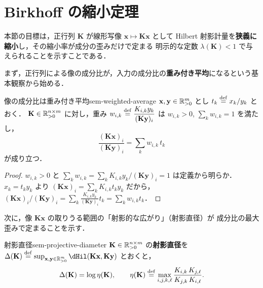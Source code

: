 \section{Birkhoff の縮小定理}
\label{sec:sem-birkhoff}

本節の目標は，正行列 $\mathbf{K}$ が線形写像 $\mathbf{x} \mapsto \mathbf{K}\mathbf{x}$ として
Hilbert 射影計量を\textbf{狭義に縮小}し，その縮小率が成分の歪みだけで定まる
明示的な定数 $\lambda(\mathbf{K}) < 1$ で与えられることを示すことである．

まず，正行列による像の成分比が，入力の成分比の\textbf{重み付き平均}になるという基本観察から始める．

\begin{claim}{像の成分比は重み付き平均}{sem-weighted-average}
  $\mathbf{x}, \mathbf{y} \in \mathbb{R}_{>0}^m$ とし $t_k \overset{\mathrm{def}}{=} x_k / y_k$ とおく．
  $\mathbf{K} \in \mathbb{R}_{>0}^{n\times m}$ に対し，重み
  $w_{i,k} \overset{\mathrm{def}}{=} \dfrac{K_{i,k} y_k}{(\mathbf{K}\mathbf{y})_i}$ は
  $w_{i,k} > 0$, $\sum_k w_{i,k} = 1$ を満たし，
  \[
    \frac{(\mathbf{K}\mathbf{x})_i}{(\mathbf{K}\mathbf{y})_i}
    = \sum_{k} w_{i,k}\, t_k
  \]
  が成り立つ．
\end{claim}

\begin{proof}
  $w_{i,k} > 0$ と $\sum_k w_{i,k} = \sum_k K_{i,k}y_k / (\mathbf{K}\mathbf{y})_i = 1$ は定義から明らか．
  $x_k = t_k y_k$ より
  $(\mathbf{K}\mathbf{x})_i = \sum_k K_{i,k} t_k y_k$ だから，
  $(\mathbf{K}\mathbf{x})_i / (\mathbf{K}\mathbf{y})_i = \sum_k \frac{K_{i,k}y_k}{(\mathbf{K}\mathbf{y})_i} t_k
  = \sum_k w_{i,k} t_k$．
\end{proof}

次に，像 $\mathbf{K}\mathbf{x}$ の取りうる範囲の「射影的な広がり」（射影直径）が
成分比の最大歪みで定まることを示す．

\begin{claim}{射影直径}{sem-projective-diameter}
  $\mathbf{K} \in \mathbb{R}_{>0}^{n\times m}$ の\textbf{射影直径}を
  $\Delta(\mathbf{K}) \defeq \sup_{\mathbf{x}, \mathbf{y} \in \Rpos^m} \dHil(\mathbf{K}\mathbf{x}, \mathbf{K}\mathbf{y})$
  とおくと，
  \[
    \Delta(\mathbf{K}) = \log \eta(\mathbf{K}),
    \qquad
    \eta(\mathbf{K}) \overset{\mathrm{def}}{=} \max_{i,j,k,\ell} \frac{K_{i,k}\, K_{j,\ell}}{K_{j,k}\, K_{i,\ell}}.
  \]
\end{claim}


